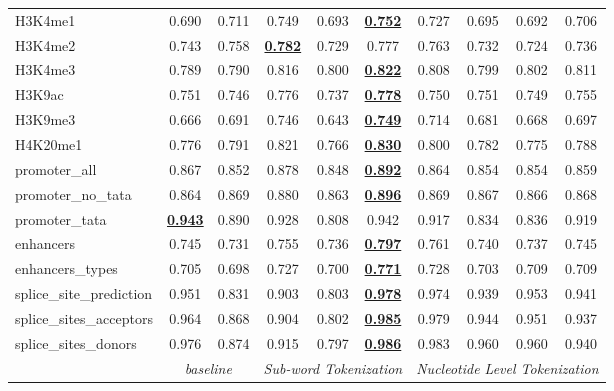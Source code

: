 \begin{table*}[h!]
\begin{center}
\begin{tabular}{l|cc|ccc|cccc}
H3K4me1 & 0.690 & 0.711 & 0.749 & 0.693 & {\ul \textbf{0.752}} & 0.727 & 0.695 & 0.692 & 0.706 \\
H3K4me2 & 0.743 & 0.758 & {\ul \textbf{0.782}} & 0.729 & 0.777 & 0.763 & 0.732 & 0.724 & 0.736 \\
H3K4me3 & 0.789 & 0.790 & 0.816 & 0.800 & {\ul \textbf{0.822}} & 0.808 & 0.799 & 0.802 & 0.811 \\
H3K9ac & 0.751 & 0.746 & 0.776 & 0.737 & {\ul \textbf{0.778}} & 0.750 & 0.751 & 0.749 & 0.755 \\
H3K9me3 & 0.666 & 0.691 & 0.746 & 0.643 & {\ul \textbf{0.749}} & 0.714 & 0.681 & 0.668 & 0.697 \\
H4K20me1 & 0.776 & 0.791 & 0.821 & 0.766 & {\ul \textbf{0.830}} & 0.800 & 0.782 & 0.775 & 0.788 \\
promoter\_all & 0.867 & 0.852 & 0.878 & 0.848 & {\ul \textbf{0.892}} & 0.864 & 0.854 & 0.854 & 0.859 \\
promoter\_no\_tata & 0.864 & 0.869 & 0.880 & 0.863 & {\ul \textbf{0.896}} & 0.869 & 0.867 & 0.866 & 0.868 \\
promoter\_tata & {\ul \textbf{0.943}} & 0.890 & 0.928 & 0.808 & 0.942 & 0.917 & 0.834 & 0.836 & 0.919 \\
enhancers & 0.745 & 0.731 & 0.755 & 0.736 & {\ul \textbf{0.797}} & 0.761 & 0.740 & 0.737 & 0.745 \\
enhancers\_types & 0.705 & 0.698 & 0.727 & 0.700 & {\ul \textbf{0.771}} & 0.728 & 0.703 & 0.709 & 0.709 \\
splice\_site\_prediction & 0.951 & 0.831 & 0.903 & 0.803 & {\ul \textbf{0.978}} & 0.974 & 0.939 & 0.953 & 0.941 \\
splice\_sites\_acceptors & 0.964 & 0.868 & 0.904 & 0.802 & {\ul \textbf{0.985}} & 0.979 & 0.944 & 0.951 & 0.937 \\
splice\_sites\_donors & 0.976 & 0.874 & 0.915 & 0.797 & {\ul \textbf{0.986}} & 0.983 & 0.960 & 0.960 & 0.940 \\
\hline
\multicolumn{1}{l|}{} & \multicolumn{2}{c|}{\textit{baseline}} & \multicolumn{3}{c|}{\textit{Sub-word Tokenization}} & \multicolumn{4}{c}{\textit{Nucleotide Level Tokenization}} \\ \hline
\end{tabular}
\end{center}
\end{table*}